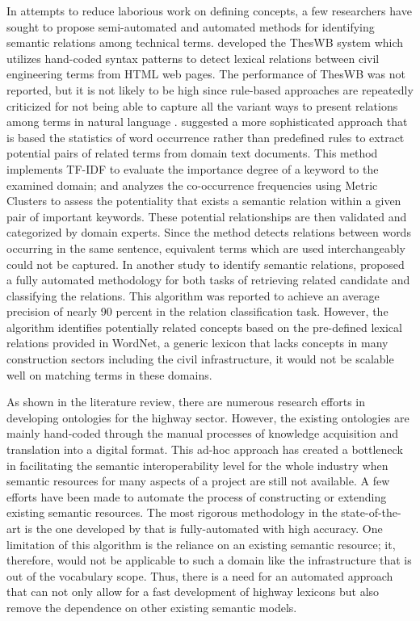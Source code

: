 \documentclass[Journal, BackFigs,NoLists, DoubleSpace]{ascelike}%
\begin{document}
In attempts to reduce laborious work on defining concepts, a few researchers have sought to propose semi-automated and automated methods for identifying semantic relations among technical terms.  developed the ThesWB system which utilizes hand-coded syntax patterns to detect lexical relations between civil engineering terms from HTML web pages. The performance of ThesWB was not reported, but it is not likely to be high since rule-based approaches are repeatedly criticized for not being able to capture all the variant ways to present relations among terms in natural language \cite{Marcus95,navigli10}.  suggested a more sophisticated approach that is based the statistics of word occurrence rather than predefined rules to extract potential pairs of related terms from domain text documents. This method implements TF-IDF to evaluate the importance degree of a keyword to the examined domain; and analyzes the co-occurrence frequencies using Metric Clusters to assess the potentiality that exists a semantic relation within a given pair of important keywords. These potential relationships are then validated and categorized by domain experts. Since the method detects relations between words occurring in the same sentence, equivalent terms which are used interchangeably could not be captured. In another study to identify semantic relations,  proposed a fully automated methodology for both tasks of retrieving related candidate and classifying the relations. This algorithm was reported to achieve an average precision of nearly 90 percent in the relation classification task. However, the algorithm identifies potentially related concepts based on the pre-defined lexical relations provided in WordNet, a generic lexicon that lacks concepts in many construction sectors including the civil infrastructure, it would not be scalable well on matching terms in these domains.
\par
As shown in the literature review, there are numerous research efforts in developing ontologies for the highway sector. However, the existing ontologies are mainly hand-coded through the manual processes of knowledge acquisition and translation into a digital format. This ad-hoc approach has created a bottleneck in facilitating the semantic interoperability level for the whole industry when semantic resources for many aspects of a project are still not available. A few efforts have been made to automate the process of constructing or extending existing semantic resources. The most rigorous methodology in the state-of-the-art is the one developed by  that is fully-automated with high accuracy. One limitation of this algorithm is the reliance on an existing semantic resource; it, therefore, would not be applicable to such a domain like the infrastructure that is out of the vocabulary scope. Thus, there is a need for an automated approach that can not only allow for a fast development of highway lexicons but also remove the dependence on other existing semantic models. 
%
\end{document}
